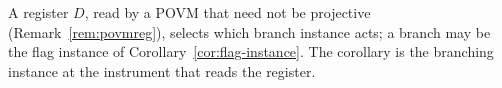 
A register $D$, read by a POVM that need not be projective
(Remark~\ref{rem:povmreg}), selects which branch instance acts; a branch may
be the flag instance of Corollary~\ref{cor:flag-instance}. The corollary is
the branching instance at the instrument that reads the register.

